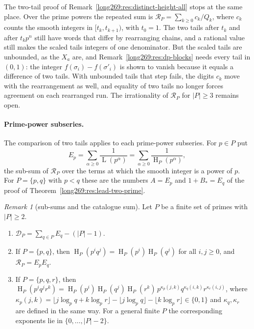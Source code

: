 \documentclass[11pt]{article}
\theoremstyle{remark}
\newtheorem{recordremark}[theorem]{Remark}
\renewenvironment{remark}[1][]{\begin{recordremark}[#1]}{\end{recordremark}}
\theoremstyle{plain}
\newcommand{\hgt}{\operatorname{H}}
\newcommand{\Lprefix}{\operatorname{L}}
\begin{document}
The two-tail proof of Remark~\ref{long269:res:distinct-height-all} stops
at the same place.  Over the prime powers the repeated sum is
$\mathcal R_P=\sum_{k\ge0}c_k/Q_k$, where $c_k$ counts the smooth integers
in $[t_k,t_{k+1})$, with $t_0=1$.  The two tails after $t_k$ and after
$t_kp^n$ still have words that differ by rearranging chains, and a rational
value still makes the scaled tails integers of one denominator.  But the
scaled tails are unbounded, as the $X_a$ are, and
Remark~\ref{long269:res:dp-blocks} needs every tail in $(0,1)$: the integer
$f(\sigma_i)-f(\sigma'_i)$ is shown to vanish because it equals a
difference of two tails.  With unbounded tails that step fails, the digits
$c_k$ move with the rearrangement as well, and equality of two tails no
longer forces agreement on each rearranged run.  The irrationality of
$\mathcal R_P$ for $|P|\ge3$ remains open.

\paragraph{Prime-power subseries.}
The comparison of two tails applies to each prime-power subseries.
For $p\in P$ put
\[
 E_p=\sum_{\alpha\ge0}\frac1{\Lprefix(p^\alpha)}=\sum_{\alpha\ge0}\frac1{\hgt_P(p^\alpha)},
\]
the sub-sum of $\mathcal R_P$ over the terms at which the smooth integer is
a power of $p$.  For $P=\{p,q\}$ with $p<q$ these are the numbers $A=E_p$
and $1+B_\ast=E_q$ of the proof of Theorem~\ref{long269:res:lead-two-prime}.

\begin{remark}[sub-sums and the catalogue sum]\label{long269:res:single-prime-identities}
Let $P$ be a finite set of primes with $|P|\ge2$.
\begin{enumerate}[label=\textup{(\roman*)}]
\item $\mathcal D_P=\sum_{q\in P}E_q-(|P|-1)$.
\item If $P=\{p,q\}$, then $\hgt_P(p^iq^j)=\hgt_P(p^i)\hgt_P(q^j)$ for all
$i,j\ge0$, and $\mathcal R_P=E_pE_q$.
\item If $P=\{p,q,r\}$, then
$\hgt_P(p^iq^jr^k)=\hgt_P(p^i)\hgt_P(q^j)\hgt_P(r^k)\,
p^{\kappa_p(j,k)}q^{\kappa_q(i,k)}r^{\kappa_r(i,j)}$, where
$\kappa_p(j,k)=\lfloor j\log_pq+k\log_pr\rfloor-\lfloor j\log_pq\rfloor-\lfloor
k\log_pr\rfloor\in\{0,1\}$ and $\kappa_q,\kappa_r$ are defined in the same
way.  For a general finite $P$ the corresponding exponents lie in
$\{0,\ldots,|P|-2\}$.
\end{enumerate}
\end{remark}
\end{document}
